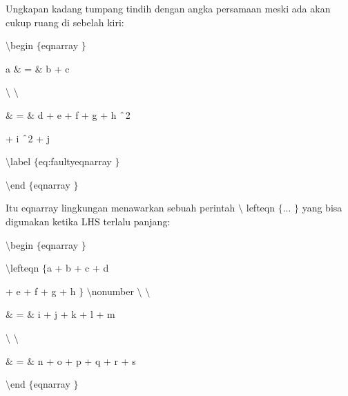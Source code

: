 \noindent 
Ungkapan kadang tumpang tindih dengan angka persamaan meski ada akan cukup ruang di sebelah kiri: \par
\vspace{12pt}
\noindent 
 $  \setminus  $begin $  \{  $eqnarray $  \}  $ \par
\vspace{12pt}
\noindent 
a  $  \&  $ =  $  \&  $ b + c \par
\noindent 
 $  \setminus  $ $  \setminus  $ \par
\vspace{12pt}
\noindent 
 $  \&  $ =  $  \&  $ d + e + f + g + h $  \string^  $2 \par
\vspace{12pt}
\noindent 
+ i $  \string^  $2 + j \par
\vspace{12pt}
\noindent 
 $  \setminus  $label $  \{  $eq:faultyeqnarray $  \}  $ \par
\vspace{12pt}
\noindent 
 $  \setminus  $end $  \{  $eqnarray $  \}  $ \par
\vspace{12pt}
\noindent 
Itu eqnarray lingkungan menawarkan sebuah perintah  $  \setminus  $ lefteqn  $  \{  $... $  \}  $ yang bisa digunakan ketika LHS terlalu panjang: \par
\noindent 
\vspace{16pt}
\noindent 
 $  \setminus  $begin $  \{  $eqnarray $  \}  $ \par
\vspace{12pt}
\noindent 
 $  \setminus  $lefteqn $  \{  $a + b + c + d \par
\vspace{12pt}
\noindent 
+ e + f + g + h $  \}  $ $  \setminus  $nonumber $  \setminus  $ $  \setminus  $ \par
\vspace{12pt}
\noindent 
 $  \&  $ =  $  \&  $ i + j + k + l + m \par
\vspace{12pt}
\noindent 
 $  \setminus  $ $  \setminus  $ \par
\vspace{12pt}
\noindent 
 $  \&  $ =  $  \&  $ n + o + p + q + r + s \par
\vspace{12pt}
\noindent 
 $  \setminus  $end $  \{  $eqnarray $  \}  $ \par
\noindent 
\vspace{16pt}
